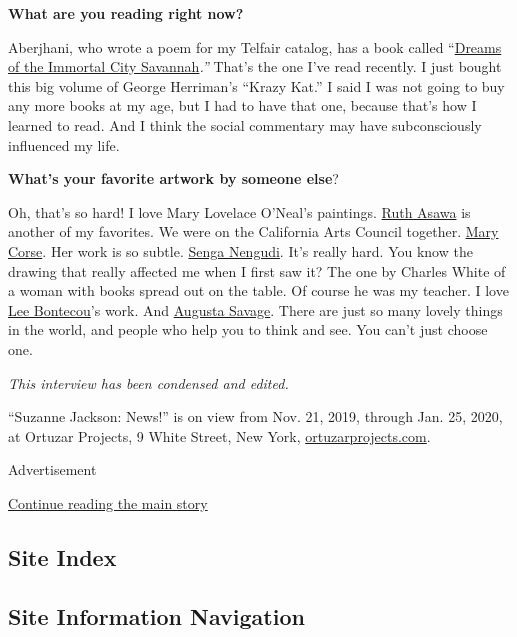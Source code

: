 \textbf{What are you reading right now?}

Aberjhani, who wrote a poem for my Telfair catalog, has a book called
``\href{https://www.author-poet-aberjhani.info/dreams-of-the-immortal-city-savannah}{Dreams
of the Immortal City Savannah}\emph{.''} That's the one I've read
recently. I just bought this big volume of George Herriman's ``Krazy
Kat.'' I said I was not going to buy any more books at my age, but I had
to have that one, because that's how I learned to read. And I think the
social commentary may have subconsciously influenced my life.

\textbf{What's your favorite artwork by someone else}?

Oh, that's so hard! I love Mary Lovelace O'Neal's paintings.
\href{https://www.nytimes.com/2013/08/18/arts/design/ruth-asawa-an-artist-who-wove-wire-dies-at-87.html}{Ruth
Asawa} is another of my favorites. We were on the California Arts
Council together.
\href{https://www.lehmannmaupin.com/artists/mary-corse}{Mary Corse}. Her
work is so subtle. \href{http://sengasenga.com/}{Senga Nengudi}. It's
really hard. You know the drawing that really affected me when I first
saw it? The one by Charles White of a woman with books spread out on the
table. Of course he was my teacher. I love
\href{https://www.moma.org/artists/670}{Lee Bontecou}'s work. And
\href{https://americanart.si.edu/artist/augusta-savage-4269}{Augusta
Savage}. There are just so many lovely things in the world, and people
who help you to think and see. You can't just choose one.

\emph{This interview has been condensed and edited.}

``Suzanne Jackson: News!'' is on view from Nov. 21, 2019, through Jan.
25, 2020, at Ortuzar Projects, 9 White Street, New York,
\href{http://www.ortuzarprojects.com/exhibitions/suzanne-jackson}{ortuzarprojects.com}.

Advertisement

\protect\hyperlink{after-bottom}{Continue reading the main story}

\hypertarget{site-index}{%
\subsection{Site Index}\label{site-index}}

\hypertarget{site-information-navigation}{%
\subsection{Site Information
Navigation}\label{site-information-navigation}}

